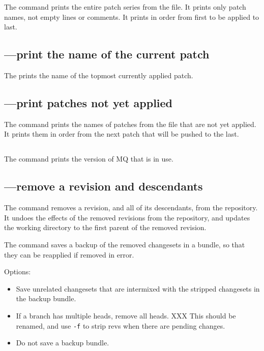 The  command prints the entire patch series from the
 file.  It prints only patch names, not empty lines
or comments.  It prints in order from first to be applied to last.

\subsection{---print the name of the current patch}

The  prints the name of the topmost currently applied
patch.

\subsection{---print patches not yet applied}

The  command prints the names of patches from the
 file that are not yet applied.  It prints them in
order from the next patch that will be pushed to the last.

\subsection{}

The  command prints the version of MQ that is in use.

\subsection{---remove a revision and descendants}

The  command removes a revision, and all of its
descendants, from the repository.  It undoes the effects of the
removed revisions from the repository, and updates the working
directory to the first parent of the removed revision.

The  command saves a backup of the removed changesets in
a bundle, so that they can be reapplied if removed in error.

Options:
\begin{itemize}
\item[\hgopt{strip}{-b}] Save unrelated changesets that are intermixed
  with the stripped changesets in the backup bundle.
\item[\hgopt{strip}{-f}] If a branch has multiple heads, remove all
  heads. XXX This should be renamed, and use \texttt{-f} to strip revs
  when there are pending changes.
\item[\hgopt{strip}{-n}] Do not save a backup bundle.
\end{itemize}
